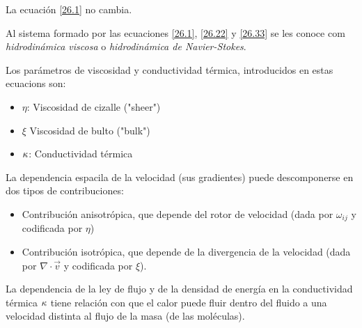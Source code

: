 La ecuación \eqref{26.1} no cambia. 

Al sistema formado por las ecuaciones \eqref{26.1}, \eqref{26.22} y \eqref{26.33} se les conoce com \textit{hidrodinámica viscosa} o \textit{hidrodinámica de Navier-Stokes}.

Los parámetros de viscosidad y conductividad térmica, introducidos en estas ecuacions son:
\begin{itemize}
	\item $\eta$: Viscosidad de cizalle ("sheer")
	\item $\xi$ Viscosidad de bulto ("bulk")
	\item $\kappa$: Conductividad térmica
\end{itemize}

La dependencia espacila de la velocidad (sus gradientes) puede descomponerse en dos tipos de contribuciones:
\begin{itemize}
	\item Contribución anisotrópica, que depende del rotor de velocidad (dada por $\omega_{ij}$ y codificada por $\eta$)
	\item Contribución isotrópica, que depende de la divergencia de la velocidad (dada por $\nabla\cdot\vec{v}$ y codificada por $\xi$).
\end{itemize}

La dependencia de la ley de flujo y de la densidad de energía en la conductividad térmica $\kappa$ tiene relación con que el calor puede fluir dentro del fluido a una velocidad distinta al flujo de la masa (de las moléculas).








